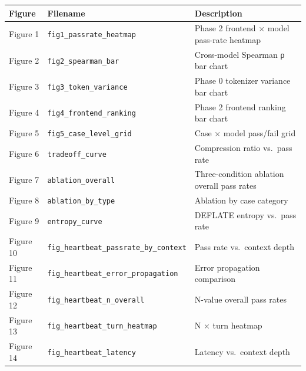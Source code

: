 {\def\LTcaptype{none} %

\begin{longtable}[]{@{}lll@{}}

\toprule\noalign{}

Figure & Filename & Description \\

\midrule\noalign{}

\endhead

\bottomrule\noalign{}

\endlastfoot

Figure 1 & \texttt{fig1\_passrate\_heatmap} & Phase 2 frontend × model pass-rate heatmap \\

Figure 2 & \texttt{fig2\_spearman\_bar} & Cross-model Spearman ρ bar chart \\

Figure 3 & \texttt{fig3\_token\_variance} & Phase 0 tokenizer variance bar chart \\

Figure 4 & \texttt{fig4\_frontend\_ranking} & Phase 2 frontend ranking bar chart \\

Figure 5 & \texttt{fig5\_case\_level\_grid} & Case × model pass/fail grid \\

Figure 6 & \texttt{tradeoff\_curve} & Compression ratio vs.~pass rate \\

Figure 7 & \texttt{ablation\_overall} & Three-condition ablation overall pass rates \\

Figure 8 & \texttt{ablation\_by\_type} & Ablation by case category \\

Figure 9 & \texttt{entropy\_curve} & DEFLATE entropy vs.~pass rate \\

Figure 10 & \texttt{fig\_heartbeat\_passrate\_by\_context} & Pass rate vs.~context depth \\

Figure 11 & \texttt{fig\_heartbeat\_error\_propagation} & Error propagation comparison \\

Figure 12 & \texttt{fig\_heartbeat\_n\_overall} & N-value overall pass rates \\

Figure 13 & \texttt{fig\_heartbeat\_turn\_heatmap} & N × turn heatmap \\

Figure 14 & \texttt{fig\_heartbeat\_latency} & Latency vs.~context depth \\

\end{longtable}

}



